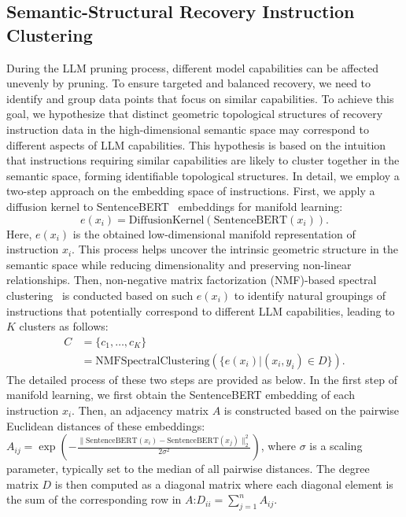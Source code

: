 \subsection{Semantic-Structural Recovery Instruction Clustering}
\label{sec:clustering}
During the LLM pruning process, different model capabilities can be affected unevenly by pruning. To ensure targeted and balanced recovery, we need to identify and group data points that focus on similar capabilities. To achieve this goal, we hypothesize that distinct geometric topological structures of recovery instruction data in the high-dimensional semantic space may correspond to different aspects of LLM capabilities. This hypothesis is based on the intuition that instructions requiring similar capabilities are likely to cluster together in the semantic space, forming identifiable topological structures. In detail, we employ a two-step approach on the embedding space of instructions. %
First, we apply a diffusion kernel to SentenceBERT~\citep{nils2019sbert} embeddings for manifold learning: 
\begin{equation}
e(x_i) = \text{DiffusionKernel}(\text{SentenceBERT}(x_i)).
\end{equation}
Here, $e(x_i)$ is the obtained low-dimensional manifold representation of instruction $x_i$. This process helps uncover the intrinsic geometric structure in the semantic space while reducing dimensionality and preserving non-linear relationships.
Then, non-negative matrix factorization (NMF)-based spectral clustering~\citep{ding2005equivalence} is conducted based on such $e(x_i)$ to identify natural groupings of instructions that potentially correspond to different LLM capabilities, leading to $K$ clusters as follows:
\begin{equation}
\begin{aligned}
    C &= \{c_1, \ldots, c_K\}  \\
      &= \text{NMFSpectralClustering}(\{e(x_i) | (x_i, y_i) \in D\}).
\end{aligned}
\end{equation}
The detailed process of these two steps are provided as below. In the first step of manifold learning, we first obtain the SentenceBERT embedding of each instruction $x_i$. Then, an adjacency matrix $A$ is constructed based on the pairwise Euclidean distances of these embeddings: $A_{ij} = \exp(-\frac{\|\text{SentenceBERT}(x_i) - \text{SentenceBERT}(x_j)\|_2^2}{2\sigma^2})$, where $\sigma$ is a scaling parameter, typically set to the median of all pairwise distances. The degree matrix $D$ is then computed as a diagonal matrix where each diagonal element is the sum of the corresponding row in $A$:$D_{ii} = \sum_{j=1}^n A_{ij}$.
